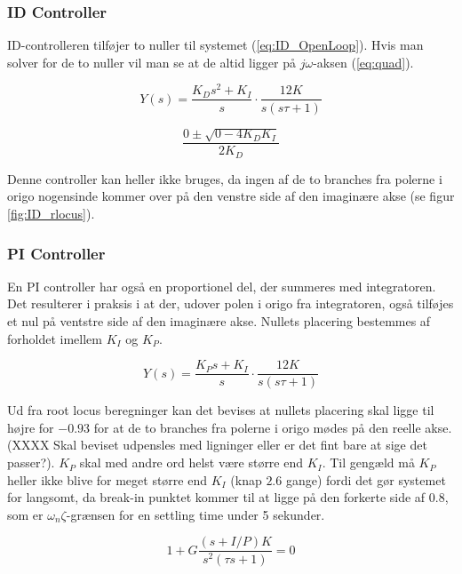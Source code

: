 \subsubsection{ID Controller}

ID-controlleren tilføjer to nuller til systemet (\ref{eq:ID_OpenLoop}). Hvis man solver for de to nuller vil man se at de altid ligger på $j\omega$-aksen (\ref{eq:quad}).

\begin{equation}\label{eq:ID_OpenLoop}
Y(s)=\frac{K_{D}s^2+K_{I}}{s}\cdot\frac{12K}{s(s\tau+1)}
\end{equation}

\begin{equation}\label{eq:quad}
\dfrac{0\pm\sqrt{0-4K_{D}K_{I}}}{2K_{D}}
\end{equation}

Denne controller kan heller ikke bruges, da ingen af de to branches fra polerne i origo nogensinde kommer over på den venstre side af den imaginære akse (se figur \ref{fig:ID_rlocus}).

\subsubsection{PI Controller}

En PI controller har også en proportionel del, der summeres med integratoren. Det resulterer i praksis i at der, udover polen i origo fra integratoren, også tilføjes et nul på ventstre side af den imaginære akse. Nullets placering bestemmes af forholdet imellem $K_{I}$ og $K_{P}$.

\begin{equation}\label{eq:PI_OpenLoop}
Y(s)=\frac{K_{P}s+K_{I}}{s}\cdot\frac{12K}{s(s\tau+1)}
\end{equation}

Ud fra root locus beregninger kan det bevises at nullets placering skal ligge til højre for $-0.93$ for at de to branches fra polerne i origo mødes på den reelle akse. (XXXX Skal beviset udpensles med ligninger eller er det fint bare at sige det passer?). $K_{P}$ skal med andre ord helst være større end $K_{I}$. Til gengæld må $K_{P}$ heller ikke blive for meget større end $K_{I}$ (knap $2.6$ gange) fordi det gør systemet for langsomt, da break-in punktet kommer til at ligge på den forkerte side af $0.8$, som er $\omega_{n}\zeta$-grænsen for en settling time under 5 sekunder. 

\begin{equation}
1+G\frac{(s+I/P)K}{s^2(\tau s+1)}=0
\end{equation}

